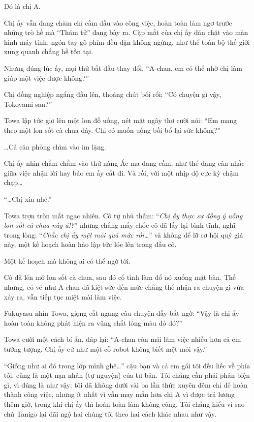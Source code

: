 \documentclass[../main.tex]{subfiles}
\begin{document}
Đó là chị A.

Chị ấy vẫn đang chăm chỉ cắm đầu vào công việc, hoàn toàn làm ngơ trước những trò hề mà ``Thám tử'' đang bày ra. Cặp mắt của chị ấy dán chặt vào màn hình máy tính, ngón tay gõ phím đều đặn không ngừng, như thể toàn bộ thế giới xung quanh chẳng hề tồn tại.

Nhưng đúng lúc ấy, mọi thứ bắt đầu thay đổi. ``A-chan, em có thể nhờ chị làm giúp một việc được không?''

Chị đồng nghiệp ngẩng đầu lên, thoáng chút bối rối: ``Có chuyện gì vậy, Tokoyami-san?''

Towa lập tức giơ lên một lon đồ uống, nét mặt ngây thơ cười nói: ``Em mang theo một lon sốt cà chua đây. Chị có muốn uống bồi bổ lại sức không?''

\dots Cả căn phòng chìm vào im lặng.

Chị ấy nhìn chằm chằm vào thứ nàng Ác ma đang cầm, như thể đang cân nhắc giữa việc nhận lời hay bảo em ấy cất đi. Và rồi, với một nhịp độ cực kỳ chậm chạp\dots

``\dots Chị xin nhé.''

Towa trợn tròn mắt ngạc nhiên. Cô tự nhủ thầm: ``\textit{Chị ấy thực sự đồng ý uống lon sốt cà chua này á!?}'' nhưng chẳng mấy chốc cô đã lấy lại bình tĩnh, nghĩ trong lòng: ``\textit{Chắc chị ấy mệt mỏi quá mức rồi\dots}'' và không để lỡ cơ hội quý giá này, một kế hoạch hoàn hảo lập tức lóe lên trong đầu cô.

Một kế hoạch mà không ai có thể ngờ tới.

Cô đã lén mở lon sốt cà chua, sau đó cố tình làm đổ nó xuống mặt bàn. Thế nhưng, có vẻ như A-chan đã kiệt sức đến mức chẳng thể nhận ra chuyện gì vừa xảy ra, vẫn tiếp tục miệt mài làm việc.

Fukuyasu nhìn Towa, giọng cắt ngang câu chuyện đầy bất ngờ: ``Vậy là chị ấy hoàn toàn không phát hiện ra vũng chất lỏng màu đỏ đó?''

Towa cười một cách bí ẩn, đáp lại: ``A-chan còn mải làm việc nhiều hơn cả em tưởng tượng. Chị ấy cứ như một cỗ robot không biết mệt mỏi vậy.''

``Giống như ai đó trong lớp mình ghê\dots'' cậu bạn và cả em gái tôi đều liếc về phía tôi, cũng là một nạn nhân (tự nguyện) của tư bản. Tôi chẳng cần phải phản biện gì, vì đúng là như vậy; tôi đã không dưới vài ba lần thức xuyên đêm chỉ để hoàn thành công việc, nhưng ít nhất vì vẫn may mắn hơn chị A vì được trả lương thêm giờ, trong khi chị ấy thì hoàn toàn làm không công. Tôi chẳng hiểu vì sao chú Tanigo lại đãi ngộ hai chúng tôi theo hai cách khác nhau như vậy.
\end{document}
